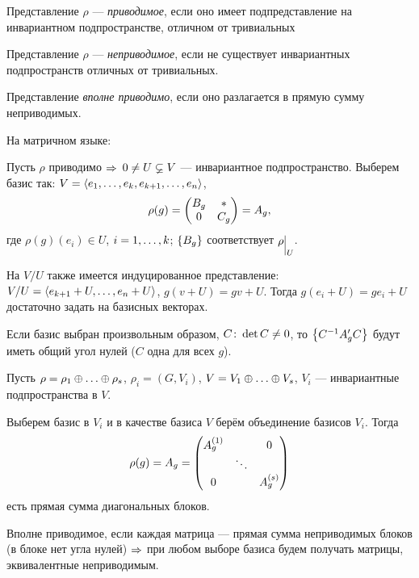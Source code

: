 \begin{df}
	Представление $\rho$ --- \textit{приводимое}, если оно имеет
	подпредставление на инвариантном подпространстве,
	отличном от тривиальных
\end{df}
\begin{df}
	Представление $\rho$ --- \textit{неприводимое}, если не существует
	инвариантных подпространств отличных от тривиальных.
\end{df}
\begin{df}
	Представление \textit{вполне приводимо},
	если оно разлагается в прямую сумму неприводимых.
\end{df}

На матричном языке:

Пусть $\rho$ приводимо $\Rightarrow$
$0 \ne U \varsubsetneq V$ --- инвариантное подпространство.
Выберем базис так: $V = \left\langle e_1 ,\ldots, e_k, e_{k + 1} ,\ldots, e_n\right\rangle$,
$$
	\rho(g) = \begin{pmatrix}B_g & * \\ 0 & C_g\end{pmatrix} = A_g,
$$
где $\rho(g)(e_i) \in U$, $i = 1 ,\ldots, k$;
$\left\{B_g\right\}$ соответствует $\rho\evn{U}$.

На $V/U$ также имеется индуцированное представление:
$V/U = \left\langle e_{k+1} + U ,\ldots, e_n + U\right\rangle$, $g(v + U) = gv + U$.
Тогда $g(e_i + U) = g e_i + U$ достаточно задать на базисных векторах.

Если базис выбран произвольным образом, $C \colon \det C \ne 0$,
то $\left\{C^{-1} A'_g C\right\}$ будут иметь общий угол нулей ($C$ одна для всех $g$).

Пусть $\rho = \rho_1 \sop \rho_s$, $\rho_i = (G, V_i)$, $V = V_1 \sop V_s$,
$V_i$ --- инвариантные подпространства в $V$.

Выберем базис в $V_i$ и в качестве базиса $V$ берём объединение базисов $V_i$.
Тогда
$$
	\rho(g) = A_g = \begin{pmatrix}A^{(1)}_g && 0 \\ & \ddots & \\ 0 && A^{(s)}_g\end{pmatrix}
$$
есть прямая сумма диагональных блоков.

Вполне приводимое, если каждая матрица ---
прямая сумма неприводимых блоков (в блоке нет угла нулей) $\Rightarrow$
при любом выборе базиса будем получать матрицы, эквивалентные неприводимым.

